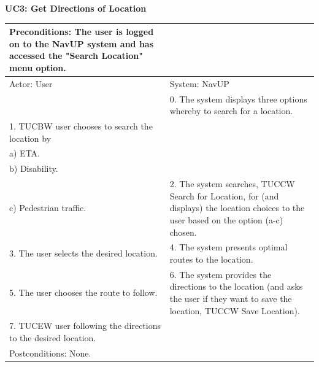 \documentclass{article}
\begin{document}
		
        		\centering
					\textbf{UC3: Get Directions of Location}\\
       		 \small
       		 \begin{tabular}{|p{8cm}|p{8cm}|}
       		 \hline
       		 Preconditions: The user is logged on to the NavUP system and has accessed the "Search Location" menu option.& \\
       		 \hline
       		 Actor: User & System: NavUP \\
        		\hline
       		 & 0.	The system displays three options whereby to search for a location.\\
       		 \hline
       		 1.	TUCBW user chooses to search the location by 

						\\a)	ETA.
						\\b)	Disability.
						\\c)	Pedestrian traffic.
 & 2.	The system searches, TUCCW Search for Location, for (and displays) the location choices to the user based on the option (a-c) chosen. \\
        		\hline
       		 3.	The user selects the desired location. & 4.	The system presents optimal routes to the location. \\
        		\hline
       		 5.	The user chooses the route to follow. & 6.	The system provides the directions to the location (and asks the user if they want to save the location, TUCCW Save Location).\\
        		\hline
        		7.	TUCEW user following the directions to the desired location. & \\
       		 \hline
        		Postconditions: None.& \\
        		\hline
        \end{tabular} 
        
\end{document}
